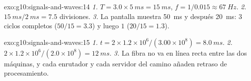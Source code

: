 \begin{solution}{exo:g10:signals-and-waves:14}
\emph{1.} $T = 3.0 \times \qty{5}{ms} = \qty{15}{ms}$,
$f = 1/0.015 \approx \qty{67}{Hz}$.
\emph{2.} $\qty{15}{ms}/\qty{2}{ms} = 7.5$ divisiones.
\emph{3.} La pantalla muestra \qty{50}{ms} y después \qty{20}{ms}: $3$
ciclos completos ($50/15 = 3.3$) y luego $1$ ($20/15 = 1.3$).
\end{solution}

\begin{solution}{exo:g10:signals-and-waves:15}
\emph{1.} $t = 2 \times 1.2\times10^{6}/(3.00\times10^{8}) =
\qty{8.0}{ms}$.
\emph{2.} $2 \times 1.2\times10^{6}/(2.0\times10^{8}) = \qty{12}{ms}$.
\emph{3.} La fibra no va en línea recta entre las dos máquinas, y cada
enrutador y cada servidor del camino añaden retraso de procesamiento.
\end{solution}

